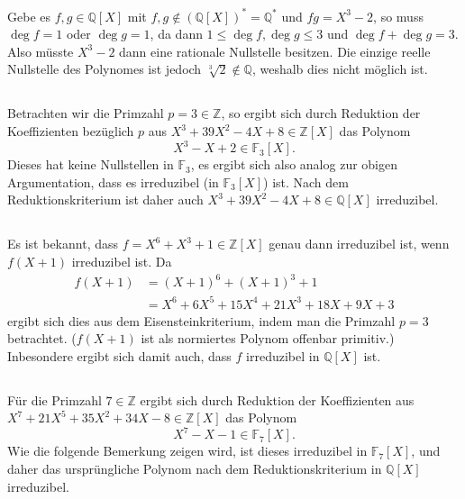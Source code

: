\documentclass[a4paper,10pt]{article}
\theoremstyle{definition}
\newcommand{\Z}{\mathbb{Z}}
\newcommand{\Q}{\mathbb{Q}}
\newcommand{\F}{\mathbb{F}}
\begin{document}
\section{}


\subsection{}
Gebe es $f,g \in \Q[X]$ mit $f,g \not\in (\Q[X])^* = \Q^*$ und $fg = X^3-2$, so muss $\deg f = 1$ oder $\deg g = 1$, da dann $1 \leq \deg f, \deg g \leq 3$ und $\deg f + \deg g = 3$. Also müsste $X^3-2$ dann eine rationale Nullstelle besitzen. Die einzige reelle Nullstelle des Polynomes ist jedoch $\sqrt[3]{2} \not\in \Q$, weshalb dies nicht möglich ist.


\subsection{}
Betrachten wir die Primzahl $p = 3 \in \Z$, so ergibt sich durch Reduktion der Koeffizienten bezüglich $p$ aus $X^3 +39X^2 -4X +8 \in \Z[X]$ das Polynom
\[
 X^3 -X +2 \in \F_3[X].
\]
Dieses hat keine Nullstellen in $\F_3$, es ergibt sich also analog zur obigen Argumentation, dass es irreduzibel (in $\F_3[X]$) ist. Nach dem Reduktionskriterium ist daher auch $X^3 +39X^2 -4X +8 \in \Q[X]$ irreduzibel.



\subsection{}
Es ist bekannt, dass $f = X^6+X^3+1 \in \Z[X]$ genau dann irreduzibel ist, wenn $f(X+1)$ irreduzibel ist. Da
\begin{align*}
 f(X+1) &= (X+1)^6+(X+1)^3+1 \\
        &= X^6 + 6X^5 + 15X^4 + 21X^3 + 18X + 9X + 3
\end{align*}
ergibt sich dies aus dem Eisensteinkriterium, indem man die Primzahl $p = 3$ betrachtet. ($f(X+1)$ ist als normiertes Polynom offenbar primitiv.) Inbesondere ergibt sich damit auch, dass $f$ irreduzibel in $\Q[X]$ ist.


\subsection{}
Für die Primzahl $7 \in \Z$ ergibt sich durch Reduktion der Koeffizienten aus $X^7 + 21X^5 + 35X^2 +34X -8 \in \Z[X]$ das Polynom
\[
 X^7 -X -1 \in \F_7[X].
\]
Wie die folgende Bemerkung zeigen wird, ist dieses irreduzibel in $\F_7[X]$, und daher das ursprüngliche Polynom nach dem Reduktionskriterium in $\Q[X]$ irreduzibel.
\end{document}
